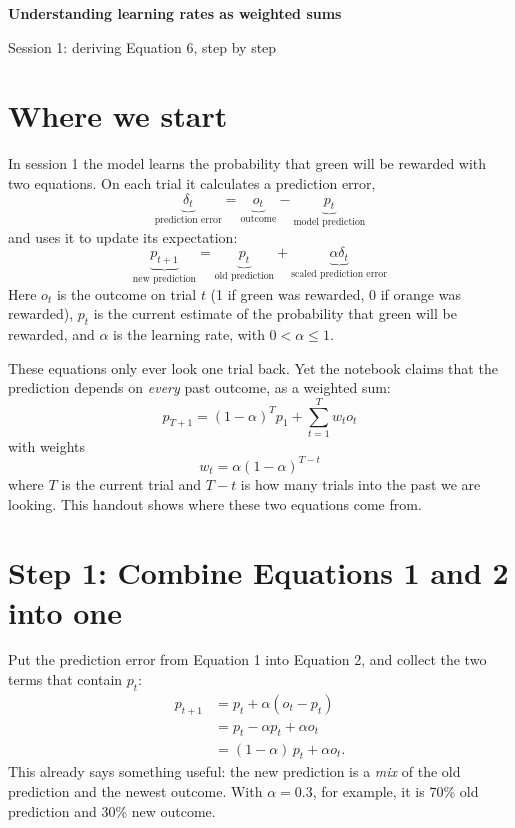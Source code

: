 \documentclass[11pt,a4paper]{article}
\begin{document}
{\LARGE\bfseries Understanding learning rates as weighted sums\par}
\vspace{0.3em}
{\large\color{muted} Session 1: deriving Equation 6, step by step\par}
\vspace{1em}

\section*{Where we start}

In session 1 the model learns the probability that green will be rewarded with two equations.
On each trial it calculates a prediction error,
\begin{equation*}
  \underbrace{\delta_t}_\textrm{prediction error} = \underbrace{o_t}_\textrm{outcome}
  - \underbrace{p_t}_\textrm{model prediction} \tag{Equation 1}
\end{equation*}
and uses it to update its expectation:
\begin{equation*}
  \underbrace{p_{t+1}}_\textrm{new prediction} = \underbrace{p_t}_\textrm{old prediction}
  + \underbrace{\alpha \delta_t}_\textrm{scaled prediction error} \tag{Equation 2}
\end{equation*}
Here $o_t$ is the outcome on trial $t$ (1 if green was rewarded, 0 if orange was rewarded),
$p_t$ is the current estimate of the probability that green will be rewarded, and $\alpha$ is the
learning rate, with $0 < \alpha \leq 1$.

These equations only ever look one trial back. Yet the notebook claims that the prediction
depends on \emph{every} past outcome, as a weighted sum:
\begin{equation*}
  p_{T+1} = (1-\alpha)^T p_1 + \sum^T_{t=1} w_t o_t \tag{Equation 5}
\end{equation*}
with weights
\begin{equation*}
  w_t = \alpha(1-\alpha)^{T-t} \tag{Equation 6}
\end{equation*}
where $T$ is the current trial and $T-t$ is how many trials into the past we are looking.
This handout shows where these two equations come from.

\section*{Step 1: Combine Equations 1 and 2 into one}

Put the prediction error from Equation 1 into Equation 2, and collect the two terms that
contain $p_t$:
\begin{align*}
  p_{t+1} &= p_t + \alpha(o_t - p_t) \\
          &= p_t - \alpha p_t + \alpha o_t \\
          &= (1-\alpha)\, p_t + \alpha o_t .
\end{align*}
This already says something useful: the new prediction is a \emph{mix} of the old prediction
and the newest outcome. With $\alpha = 0.3$, for example, it is 70\% old prediction and 30\% new
outcome.
\end{document}
